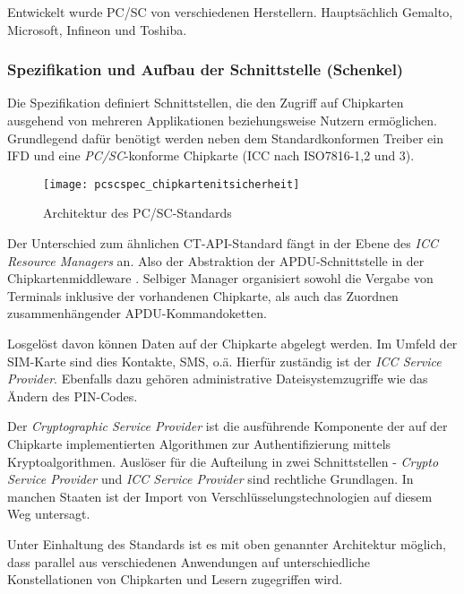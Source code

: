 Entwickelt wurde PC/SC von verschiedenen Herstellern. Hauptsächlich
Gemalto, Microsoft, Infineon und Toshiba.

\subsubsection{Spezifikation und Aufbau der Schnittstelle (Schenkel)}
Die Spezifikation definiert Schnittstellen, die den Zugriff auf Chipkarten ausgehend
von mehreren Applikationen beziehungsweise Nutzern ermöglichen. Grundlegend
dafür benötigt werden neben dem Standardkonformen Treiber ein \ac{IFD} und
eine \textit{PC/SC}-konforme Chipkarte (\ac{ICC} nach ISO7816-1,2 und 3).

 \begin{figure}[htp]
  \begin{center}
   \texttt{[image: pcscspec\_chipkartenitsicherheit]}
  \end{center}
  \caption[Architektur des PC/SC-Standards]{Architektur des PC/SC-Standards \cite{spitz11}}
  \label{abb:architektur_pcsc}
 \end{figure}

Der Unterschied zum ähnlichen CT-API-Standard fängt in der Ebene
des \textit{ICC Resource Managers} an. Also der Abstraktion der
APDU-Schnittstelle in der Chipkartenmiddleware \cite{spitz11}.
Selbiger Manager organisiert sowohl die Vergabe von Terminals inklusive
der vorhandenen Chipkarte, als auch das Zuordnen zusammenhängender
APDU-Kommandoketten.

Losgelöst davon können Daten auf der Chipkarte abgelegt werden. Im Umfeld
der SIM-Karte sind dies Kontakte, SMS, o.ä. Hierfür zuständig ist der
\textit{ICC Service Provider}. Ebenfalls dazu gehören administrative Dateisystemzugriffe
wie das Ändern des PIN-Codes.

Der \textit{Cryptographic Service Provider} ist die ausführende Komponente
der auf der Chipkarte implementierten Algorithmen zur Authentifizierung mittels
Kryptoalgorithmen. Auslöser für die Aufteilung in zwei Schnittstellen -
\textit{Crypto Service Provider} und \textit{ICC Service Provider} sind
rechtliche Grundlagen. In manchen Staaten ist der Import von
Verschlüsselungstechnologien auf diesem Weg untersagt.

Unter Einhaltung des Standards ist es mit oben genannter Architektur möglich,
dass parallel aus verschiedenen Anwendungen auf unterschiedliche Konstellationen
von Chipkarten und Lesern zugegriffen wird.

